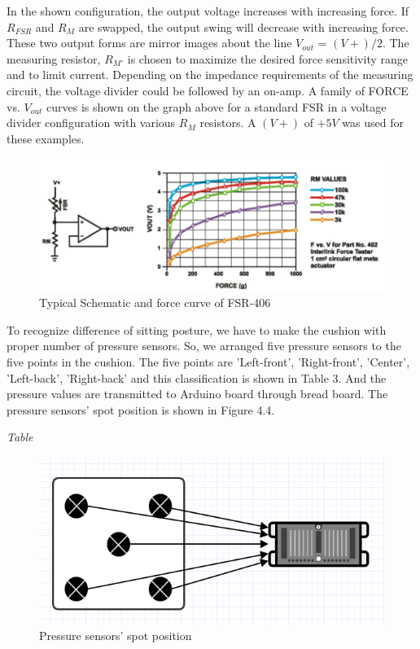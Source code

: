 \documentclass[conference]{IEEEtran}
\begin{document}
In the shown configuration, the output voltage increases with increasing force. If ${R}_{FSR}$ and ${R}_{M}$ are swapped, the output swing will decrease with increasing force. These two output forms are mirror images about the line ${V}_{out}$  = $(V+) / 2$. The measuring resistor, ${R}_{M'}$ is chosen to maximize the desired force sensitivity range and to limit current. Depending on the impedance requirements of the measuring circuit, the voltage divider could be followed by an on-amp. A family of FORCE vs. ${V}_{out}$ curves is shown on the graph above for a standard FSR in a voltage divider configuration with various ${R}_{M}$ resistors. A $(V+)$ of $+5V$ was used for these examples.

\begin{figure}[htbp]
\begin{center}
    \includegraphics[scale=0.375]{img_07.png}
    \caption{Typical Schematic and force curve of FSR-406} 
\end{center}
\end{figure}

To recognize difference of sitting posture, we have to make the cushion with proper number of pressure sensors. So, we arranged five pressure sensors to the five points in the cushion. The five points are 'Left-front', 'Right-front', 'Center', 'Left-back', 'Right-back' and this classification is shown in Table 3. And the pressure values are transmitted to Arduino board through bread board. The pressure sensors' spot position is shown in Figure 4.4.

\emph{Table}

\begin{figure}[htbp]
\begin{center}
    \includegraphics[scale=0.5]{img_08.png}
    \caption{Pressure sensors' spot position} 
\end{center}
\end{figure}
\end{document}
